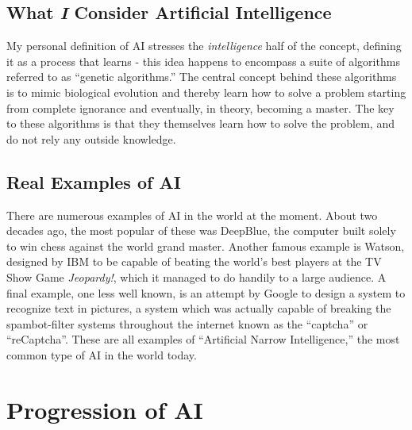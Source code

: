 \documentclass[12pt]{article} %
\begin{document}

\subsection{What \textit{I} Consider Artificial Intelligence}

My personal definition of AI stresses the \textit{intelligence} half of the concept, defining it as a process that learns - this idea happens to encompass a suite of algorithms referred to as ``genetic algorithms.'' The central concept behind these algorithms is to mimic biological evolution and thereby learn how to solve a problem starting from complete ignorance and eventually, in theory, becoming a master. The key to these algorithms is that they themselves learn how to solve the problem, and do not rely any outside knowledge.


\subsection{Real Examples of AI}

There are numerous examples of AI in the world at the moment. About two decades ago, the most popular of these was DeepBlue, the computer built solely to win chess against the world grand master\cite{deepblue}. Another famous example is Watson, designed by IBM to be capable of beating the world's best players at the TV Show Game \textit{Jeopardy!}\cite{watson}, which it managed to do handily to a large audience\cite{watsonwins}. A final example, one less well known, is an attempt by Google to design a system to recognize text in pictures, a system which was actually capable of breaking the spambot-filter systems throughout the internet known as the ``captcha'' or ``reCaptcha''. These are all examples of ``Artificial Narrow Intelligence,'' the most common type of AI in the world today.


\section{Progression of AI}

\end{document}
